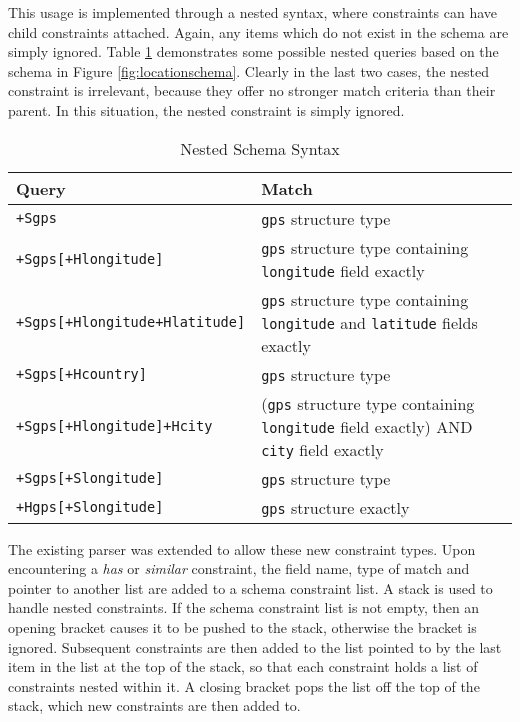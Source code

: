 \documentclass[12pt,twoside,notitlepage]{report}
\begin{document}
This usage is implemented through a nested syntax, where constraints can have child constraints attached. 
Again, any items which do not exist in the schema are simply ignored. 
Table \ref{tab:nested_schema_syntax} demonstrates some possible nested queries based on the schema in Figure \ref{fig:locationschema}. 
Clearly in the last two cases, the nested constraint is irrelevant, because they offer no stronger match criteria than their parent. 
In this situation, the nested constraint is simply ignored.

\begin{table}[tbh]
\centering

\begin{tabular}{l p{8cm}}
\hline\hline
Query & Match \\
\hline

{\tt +Sgps}							& {\tt gps} structure type \\
{\tt +Sgps[+Hlongitude]}			& {\tt gps} structure type containing {\tt longitude} field exactly \\
{\tt +Sgps[+Hlongitude+Hlatitude]}	& {\tt gps} structure type containing {\tt longitude} and {\tt latitude} fields exactly \\

{\tt +Sgps[+Hcountry]}				& {\tt gps} structure type \\

{\tt +Sgps[+Hlongitude]+Hcity}		& ({\tt gps} structure type containing {\tt longitude} field exactly) AND {\tt city} field exactly \\

{\tt +Sgps[+Slongitude]}			& {\tt gps} structure type \\
{\tt +Hgps[+Slongitude]}			& {\tt gps} structure exactly \\

\hline
\end{tabular}

\caption{Nested Schema Syntax}
\label{tab:nested_schema_syntax}
\end{table}

The existing parser was extended to allow these new constraint types. 
Upon encountering a {\sl has} or {\sl similar} constraint, the field name, type of match and pointer to another list are added to a schema constraint list. 
A stack is used to handle nested constraints. 
If the schema constraint list is not empty, then an opening bracket causes it to be pushed to the stack, otherwise the bracket is ignored. 
Subsequent constraints are then added to the list pointed to by the last item in the list at the top of the stack, so that each constraint holds a list of constraints nested within it. 
A closing bracket pops the list off the top of the stack, which new constraints are then added to. 
\end{document}
